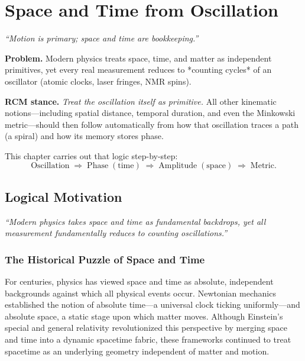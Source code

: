 \chapter{Space and Time from Oscillation}



\begin{center}
\emph{“Motion is primary; space and time are bookkeeping.”}
\end{center}

\begin{concept}
\textbf{Problem.}  Modern physics treats space, time, and matter as
independent primitives, yet every real measurement reduces to *counting
cycles* of an oscillator (atomic clocks, laser fringes, NMR spins).

\textbf{RCM stance.}  \emph{Treat the oscillation itself as primitive.}
All other kinematic notions—including spatial distance, temporal duration,
and even the Minkowski metric—should then follow automatically from how that
oscillation traces a path (a spiral) and how its memory stores phase.

This chapter carries out that logic step-by-step:  
\[
\text{Oscillation} \;\Longrightarrow\; 
\text{Phase} \;(\text{time}) \;\Longrightarrow\; 
\text{Amplitude} \;(\text{space}) \;\Longrightarrow\; 
\text{Metric.}
\]
\end{concept}
\section{Logical Motivation}

\textit{“Modern physics takes space and time as fundamental backdrops, yet all measurement fundamentally reduces to counting oscillations.”}

\subsection{The Historical Puzzle of Space and Time}

For centuries, physics has viewed space and time as absolute, independent backgrounds against which all physical events occur. Newtonian mechanics established the notion of absolute time—a universal clock ticking uniformly—and absolute space, a static stage upon which matter moves. Although Einstein’s special and general relativity revolutionized this perspective by merging space and time into a dynamic spacetime fabric, these frameworks continued to treat spacetime as an underlying geometry independent of matter and motion.

